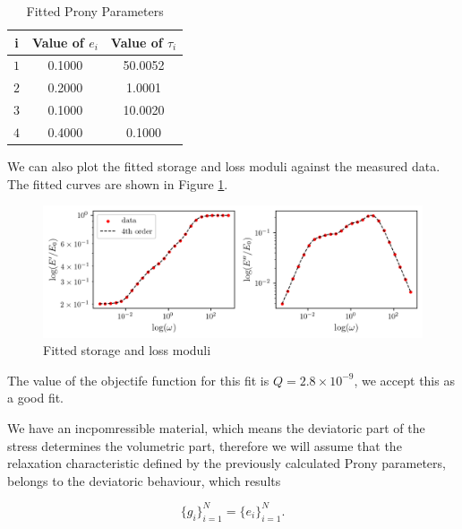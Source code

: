 \documentclass[12pt,a4paper]{article}
\begin{document}
\begin{table}[H]
    \centering
    \caption{Fitted Prony Parameters}
    \label{tab:prony_parameters}
    \begin{tabular}{|c|c|c|}
        \hline
        \textbf{i} & \textbf{Value of $e_i$} & \textbf{Value of $\tau_i$} \\ \hline
        $1$              & 0.1000             & 50.0052                    \\ \hline
        $2$              & 0.2000              &  1.0001                   \\ \hline
        $3$              & 0.1000              & 10.0020                    \\ \hline
        $4$              & 0.4000              & 0.1000                    \\ \hline
    \end{tabular}
\end{table}

We can also plot the fitted storage and loss moduli against the measured data. The fitted curves are shown in Figure \ref{fig:fittedmodel}.
\begin{figure}[H]
    \centering
    \includegraphics[scale=0.875]{figures/fitted.png}
    \caption{Fitted storage and loss moduli}
    \label{fig:fittedmodel}
\end{figure}

The value of the objectife function for this fit is $Q = 2.8\times 10^{-9}$, we accept this as a good fit.

\newpage

We have an incpomressible material, which means the deviatoric part of the stress determines the volumetric part, therefore we will assume that the relaxation characteristic defined by the previously calculated Prony parameters, belongs to the deviatoric behaviour, which results

\begin{equation}
    \{g_i\}_{i=1}^N = \{e_i\}_{i=1}^N.
\end{equation}
\end{document}
